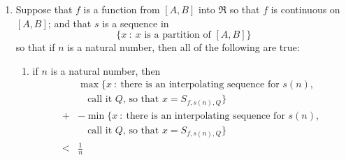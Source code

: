 \documentclass{article}
\begin{document}
\begin{itemize}
\begin{enumerate}[\hspace{1cm}(a.)]
\begin{enumerate}[\hspace{1cm}(i.)]
          \item 
            \begin{align*}
              [ \ & \min \{ x \ : \ \text{there is an interpolating sequence for $P\hat{\ }$, } 
               \\ & \quad \text{call it $Q$, so that $x = S_{f, P\hat{\ }, Q}$} \},
               \\ & \max \{ x \ : \ \text{there is an interpolating sequence for $P\hat{\ }$, } 
               \\ & \quad \text{call it $Q$, so that $x = S_{f, P\hat{\ }, Q}$} \} \ ]
               \\ \subset & \ \\
              [ \ & \min \{ x \ : \ \text{there is an interpolating sequence for $P$, } 
               \\ & \quad \text{call it $Q$, so that $x = S_{f, P, Q}$} \},
               \\ & \max \{ x \ : \ \text{there is an interpolating sequence for $P$, } 
               \\ & \quad \text{call it $Q$, so that $x = S_{f, P, Q}$} \} \ ]
            \end{align*}
          
        \end{enumerate}
        
      \item Suppose that $f$ is a function from $[A,B]$ into $\Re$ so that $f$ is continuous on $[A,B]$; and that $s$ is a sequence in 
        \begin{equation*}
        \{ x\ :\ x \text{ is a partition of } [A,B] \}
        \end{equation*}
        so that if $n$ is a natural number, then all of the following are true:
      
        \begin{enumerate}[\hspace{1cm}(i.)]

          \item if $n$ is a natural number, then 
            \begin{align*}
                 \ & \max \{ x \ : \ \text{there is an interpolating sequence for $s(n)$, } 
                \\ & \quad \text{call it $Q$, so that $x = S_{f, s(n), Q}$} \}
              \\ + & -\min \{ x \ : \ \text{there is an interpolating sequence for $s(n)$, } 
                \\ & \quad \text{call it $Q$, so that $x = S_{f, s(n), Q}$} \}
              \\ < & \frac{1}{n}
            \end{align*}


\end{enumerate}
\end{enumerate}
\end{itemize}
\end{document}
